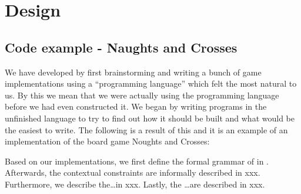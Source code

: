 \chapter{Design}
\label{chap:design}

\section{Code example - Naughts and Crosses}

We have developed \productname{} by first brainstorming and writing a bunch of
game implementations using a ``programming language'' which felt the most
natural to us. By this we mean that we were actually using the programming
language before we had even constructed it. We began by writing programs in the
unfinished language to try to find out how it should be built and what would be
the easiest to write. The following is a result of this and it is an example of an
implementation of the board game Noughts and Crosses:


Based on our implementations, we first define the formal grammar of
\productname{} in . Afterwards, the contextual constraints
are informally described  in xxx. Furthermore, we describe the\dots in xxx. Lastly, the 
\ldots are described in xxx.










